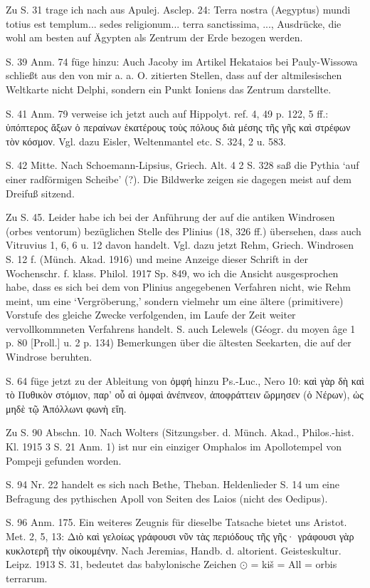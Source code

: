 \documentclass[a4paper, 11pt, oneside]{article}
\begin{document}
Zu S. 31 trage ich nach aus Apulej. Asclep. 24: Terra nostra (Aegyptus) mundi totius est templum... sedes religionum... terra sanctissima, ..., Ausdrücke, die wohl am besten auf Ägypten als Zentrum der Erde bezogen werden.

S. 39 Anm. 74 füge hinzu: Auch Jacoby im Artikel Hekataios bei Pauly-Wissowa schließt aus den von mir a. a. O. zitierten Stellen, dass auf der altmilesischen Weltkarte nicht Delphi, sondern ein Punkt Ioniens das Zentrum darstellte.

S. 41 Anm. 79 verweise ich jetzt auch auf Hippolyt. ref. 4, 49 p. 122, 5 ff.: ὑπόπτερος ἄξων ὁ περαίνων ἑκατέρους τοὺς πόλους διὰ μέσης τῆς γῆς καὶ στρέφων τὸν κόσμον. Vgl. dazu Eisler, Weltenmantel etc. S. 324, 2 u. 583.

S. 42 Mitte. Nach Schoemann-Lipsius, Griech. Alt. 4 2 S. 328 saß die Pythia `auf einer radförmigen Scheibe' (?). Die Bildwerke zeigen sie dagegen meist auf dem Dreifuß sitzend.

Zu S. 45. Leider habe ich bei der Anführung der auf die antiken Windrosen (orbes ventorum) bezüglichen Stelle des Plinius (18, 326 ff.) übersehen, dass auch Vitruvius 1, 6, 6 u. 12 davon handelt. Vgl. dazu jetzt Rehm, Griech. Windrosen S. 12 f. (Münch. Akad. 1916) und meine Anzeige dieser Schrift in der Wochenschr. f. klass. Philol. 1917 Sp. 849, wo ich die Ansicht ausgesprochen habe, dass es sich bei dem von Plinius angegebenen Verfahren nicht, wie Rehm meint, um eine `Vergröberung,' sondern vielmehr um eine ältere (primitivere) Vorstufe des gleiche Zwecke verfolgenden, im Laufe der Zeit weiter vervollkommneten Verfahrens handelt. S. auch Lelewels (Géogr. du moyen âge 1 p. 80 [Proll.] u. 2 p. 134) Bemerkungen über die ältesten Seekarten, die auf der Windrose beruhten.

S. 64 füge jetzt zu der Ableitung von ὀμφή hinzu Ps.-Luc., Nero 10: καὶ γὰρ δὴ καὶ τὸ Πυθικὸν στόμιον, παρ' οὗ αἱ ὀμφαὶ ἀνέπνεον,
ἀποφράττειν ὥρμησεν (ὁ Νέρων), ὡς μηδὲ τῷ Ἀπόλλωνι φωνὴ εἴη.

Zu S. 90 Abschn. 10. Nach Wolters (Sitzungsber. d. Münch. Akad., Philos.-hist. Kl. 1915 3 S. 21 Anm. 1) ist nur ein einziger Omphalos im Apollotempel von Pompeji gefunden worden.

S. 94 Nr. 22 handelt es sich nach Bethe, Theban. Heldenlieder S. 14 um eine Befragung des pythischen Apoll von Seiten des Laios (nicht des Oedipus).

S. 96 Anm. 175. Ein weiteres Zeugnis für dieselbe Tatsache bietet uns Aristot. Met. 2, 5, 13: Διὸ καὶ γελοίως γράφουσι νῦν τὰς περιόδους τῆς γῆς· γράφουσι γὰρ κυκλοτερῆ τὴν οἰκουμένην. Nach Jeremias, Handb. d. altorient. Geisteskultur. Leipz. 1913 S. 31, bedeutet das babylonische Zeichen $\odot$ = kiš = All = orbis terrarum.
\end{document}
